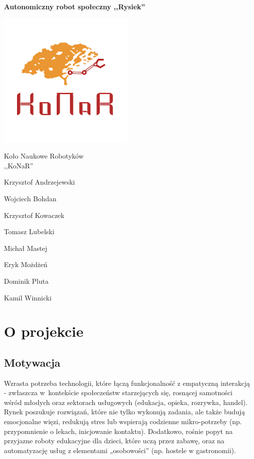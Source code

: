 \documentclass{article}
\begin{document}
    \begin{titlepage}
        \centering
        {\Huge\bfseries Autonomiczny robot społeczny ,,Rysiek''\par}
        \includegraphics[width=0.5\textwidth]{figures/konar.png}\par
        {\huge Koło Naukowe Robotyków\\,,KoNaR''\par}
        {\par}\vspace{1cm}
        {\large Krzysztof Andrzejewski\par}
        {\large Wojciech Bohdan\par}
        {\large Krzysztof Kowaczek\par}
        {\large Tomasz Lubelski\par}
        {\large Michał Mastej\par}
        {\large Eryk Możdżeń\par}
        {\large Dominik Pluta\par}
        {\large Kamil Winnicki\par}
    \end{titlepage}

    \section{O projekcie}
        \subsection*{Motywacja}
            Wzrasta potrzeba technologii, które łączą funkcjonalność z empatyczną interakcją - zwłaszcza w~kontekście
            społeczeństw starzejących się, rosnącej samotności wśród młodych oraz sektorach usługowych (edukacja, opieka, rozrywka, handel).
            Rynek poszukuje rozwiązań, które nie tylko wykonują zadania, ale także budują emocjonalne więzi, redukują stres lub wspierają codzienne mikro-potrzeby
            (np. przypomnienie o lekach, inicjowanie kontaktu).
            Dodatkowo, rośnie popyt na przyjazne roboty edukacyjne dla dzieci, które uczą przez zabawę,
            oraz na automatyzację usług z elementami „osobowości” (np. hostele w gastronomii).
\end{document}
